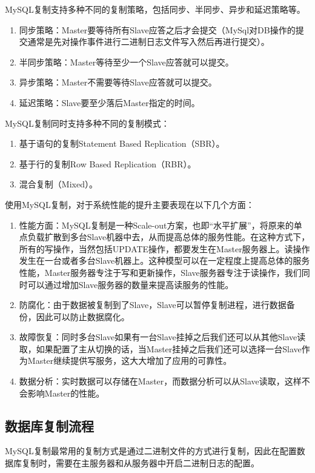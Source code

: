 MySQL复制支持多种不同的复制策略，包括同步、半同步、异步和延迟策略等。
\begin{enumerate}
\item 同步策略：Master要等待所有Slave应答之后才会提交（MySql对DB操作的提交通常是先对操作事件进行二进制日志文件写入然后再进行提交）。
\item 半同步策略：Master等待至少一个Slave应答就可以提交。
\item 异步策略：Master不需要等待Slave应答就可以提交。
\item 延迟策略：Slave要至少落后Master指定的时间。
\end{enumerate}
MySQL复制同时支持多种不同的复制模式：
\begin{enumerate}
\item 基于语句的复制Statement Based Replication（SBR）。
\item 基于行的复制Row Based Replication（RBR）。
\item 混合复制（Mixed）。
\end{enumerate}
使用MySQL复制，对于系统性能的提升主要表现在以下几个方面：
\begin{enumerate}
\item 性能方面：MySQL复制是一种Scale-out方案，也即“水平扩展”，将原来的单点负载扩散到多台Slave机器中去，从而提高总体的服务性能。在这种方式下，所有的写操作，当然包括UPDATE操作，都要发生在Master服务器上。读操作发生在一台或者多台Slave机器上。这种模型可以在一定程度上提高总体的服务性能，Master服务器专注于写和更新操作，Slave服务器专注于读操作，我们同时可以通过增加Slave服务器的数量来提高读服务的性能。

\item 防腐化：由于数据被复制到了Slave，Slave可以暂停复制进程，进行数据备份，因此可以防止数据腐化。

\item 故障恢复：同时多台Slave如果有一台Slave挂掉之后我们还可以从其他Slave读取，如果配置了主从切换的话，当Master挂掉之后我们还可以选择一台Slave作为Master继续提供写服务，这大大增加了应用的可靠性。

\item 数据分析：实时数据可以存储在Master，而数据分析可以从Slave读取，这样不会影响Master的性能。
\end{enumerate}
\subsection{数据库复制流程}
MySQL复制最常用的复制方式是通过二进制文件的方式进行复制，因此在配置数据库复制时，需要在主服务器和从服务器中开启二进制日志的配置。

